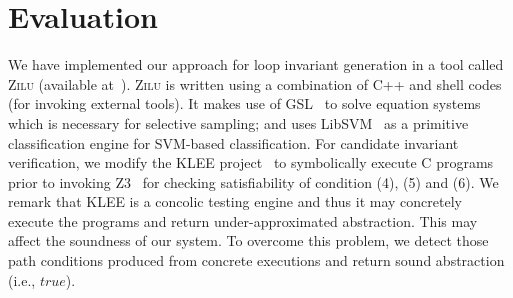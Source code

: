 \section{Evaluation} %
\label{sec:evaluations}
We have implemented our approach for loop invariant generation in a tool called \textsc{Zilu} (available at~\cite{zilu:repo}).
\textsc{Zilu} is written using a combination of C++ and shell codes (for invoking external tools). It makes use of GSL~\cite{gough2009gnu} to solve equation systems which is necessary for selective sampling; and uses LibSVM~\cite{chang2011libsvm} as a primitive classification engine for SVM-based classification. For candidate invariant verification, we modify the KLEE project~\cite{cadar2008klee} to symbolically execute C programs prior to invoking Z3~\cite{de2008z3} for checking satisfiability of
condition (4), (5) and (6). We remark that KLEE is a concolic testing engine and thus it may concretely execute the programs and return under-approximated abstraction. This may affect the soundness of our system.
To overcome this problem, we detect those path conditions produced from concrete executions and return sound abstraction (i.e., $true$). %


